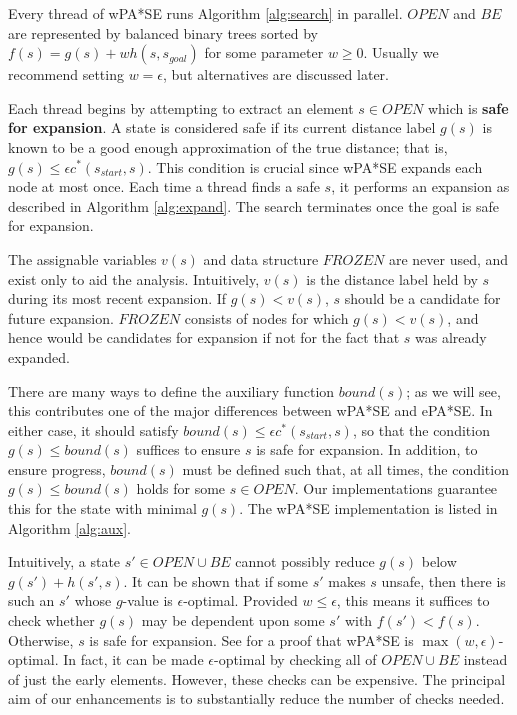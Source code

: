 \documentclass[letterpaper]{article}
\begin{document}
Every thread of wPA*SE runs Algorithm \ref{alg:search} in parallel. $OPEN$ and $BE$ are represented by balanced binary trees sorted by $f(s) = g(s) + wh(s,s_{goal})$ for some parameter $w\ge 0$. Usually we recommend setting $w=\epsilon$, but alternatives are discussed later.

Each thread begins by attempting to extract an element $s\in OPEN$ which is \textbf{safe for expansion}. A state is considered safe if its current distance label $g(s)$ is known to be a good enough approximation of the true distance; that is, $g(s) \le \epsilon c^*(s_{start},s)$. This condition is crucial since wPA*SE expands each node at most once. Each time a thread finds a safe $s$, it performs an expansion as described in Algorithm \ref{alg:expand}. The search terminates once the goal is safe for expansion.

The assignable variables $v(s)$ and data structure $FROZEN$ are never used, and exist only to aid the analysis. Intuitively, $v(s)$ is the distance label held by $s$ during its most recent expansion. If $g(s) < v(s)$, $s$ should be a candidate for future expansion. $FROZEN$ consists of nodes for which $g(s) < v(s)$, and hence would be candidates for expansion if not for the fact that $s$ was already expanded.

There are many ways to define the auxiliary function $bound(s)$; as we will see, this contributes one of the major differences between wPA*SE and ePA*SE. In either case, it should satisfy $bound(s) \le \epsilon c^*(s_{start},s)$, so that the condition $g(s) \le bound(s)$ suffices to ensure $s$ is safe for expansion. In addition, to ensure progress, $bound(s)$ must be defined such that, at all times, the condition $g(s) \le bound(s)$ holds for some $s\in OPEN$. Our implementations guarantee this for the state with minimal $g(s)$. The wPA*SE implementation is listed in Algorithm \ref{alg:aux}.

Intuitively, a state $s'\in OPEN\cup BE$ cannot possibly reduce $g(s)$ below $g(s') + h(s',s)$. It can be shown that if some $s'$ makes $s$ unsafe, then there is such an $s'$ whose $g$-value is $\epsilon$-optimal. Provided $w \le \epsilon$, this means it suffices to check whether $g(s)$ may be dependent upon some $s'$ with $f(s') < f(s)$. Otherwise, $s$ is safe for expansion. See \cite{} for a proof that wPA*SE is $\max(w, \epsilon)$-optimal. In fact, it can be made $\epsilon$-optimal by checking all of $OPEN\cup BE$ instead of just the early elements. However, these checks can be expensive. The principal aim of our enhancements is to substantially reduce the number of checks needed.
\end{document}
